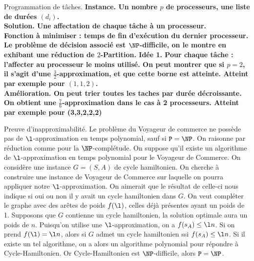 \documentclass[french, 11pt]{article}
\begin{document}
\begin{ex}{Programmation de tâches.}{}
    \bf{Instance.} Un nombre $p$ de processeurs, une liste de durées $(d_i)$.\\
    \bf{Solution.} Une affectation de chaque tâche à un processeur.\\
    Fonction à minimiser : temps de fin d'exécution du dernier processeur.\\
    Le problème de décision associé est $\NP$-difficile, on le montre en exhibant une réduction de $2$-Partition.
    \tcblower
    \bf{Idée 1.} Pour chaque tâche : l'affecter au processeur le moins utilisé. On peut montrer que si $p=2$, il s'agit d'une $\frac{3}{2}$-approximation, et que cette borne est atteinte. Atteint par exemple pour $(1,1,2)$.\\
    \bf{Amélioration.} On peut trier toutes les taches par durée décroissante. On obtient une $\frac{7}{6}$-approximation dans le cas à 2 processeurs. Atteint par exemple pour (3,3,2,2,2)
\end{ex}

\vspace*{-0.5cm}

\begin{prop}{Preuve d'inapproximabilité.}{}
    Le problème du Voyageur de commerce ne possède pas de $\l$-approximation en temps polynomial, sauf si $\texttt{P}=\NP$.
    \tcblower
    On raisonne par réduction comme pour la $\NP$-complétude. On suppose qu'il existe un algorithme de $\l$-approximation en temps polynomial pour le Voyageur de Commerce. On considère une instance $G=(S,A)$ de cycle hamiltonien. On cherche à construire une instance de Voyageur de Commerce sur laquelle on pourra appliquer notre $\l$-approximation. On aimerait que le résultat de celle-ci nous indique si oui ou non il y avait un cycle hamiltonien dans $G$. On veut compléter le graphe avec des arêtes de poids $f(\l)$, celles déjà présentes ayant un poids de 1. Supposons que $G$ contienne un cycle hamiltonien, la solution optimale aura un poids de $n$. Puisqu'on utilise une $\l$-approximation, on a $f(s_A)\leq \l n$. Si on prend $f(\l)=\l n$, alors si $G$ admet un cycle hamiltonien ssi $f(s_A)\leq \l n$. Si il existe un tel algorithme, on a alors un algorithme polynomial pour répondre à Cycle-Hamiltonien. Or Cycle-Hamiltonien est $\NP$-difficile, alors $\texttt{P}=\NP$.
\end{prop}
\end{document}
